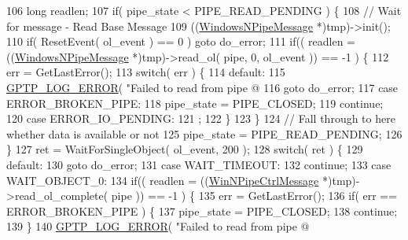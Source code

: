 \begin{DoxyCode}
{{106             \textcolor{keywordtype}{long} readlen;
107             \textcolor{keywordflow}{if}( pipe\_state < PIPE\_READ\_PENDING ) \{
108                 \textcolor{comment}{// Wait for message - Read Base Message}
109                 ((\hyperlink{class_windows_n_pipe_message}{WindowsNPipeMessage} *)tmp)->init();
110                 \textcolor{keywordflow}{if}( ResetEvent( ol\_event ) == 0 ) \textcolor{keywordflow}{goto} do\_error;
111                 \textcolor{keywordflow}{if}(( readlen =  ((\hyperlink{class_windows_n_pipe_message}{WindowsNPipeMessage} *)tmp)->read\_ol( pipe, 0, ol\_event
       )) == -1 ) \{
112                     err = GetLastError();
113                     \textcolor{keywordflow}{switch}( err ) \{
114                     \textcolor{keywordflow}{default}:
115                         \hyperlink{gptp__log_8hpp_afefbb1009717c128012bfeed94842987}{GPTP\_LOG\_ERROR}( \textcolor{stringliteral}{"Failed to read from pipe @%
116                         \textcolor{keywordflow}{goto} do\_error;
117                     \textcolor{keywordflow}{case} ERROR\_BROKEN\_PIPE:
118                         pipe\_state = PIPE\_CLOSED;
119                         \textcolor{keywordflow}{continue};
120                     \textcolor{keywordflow}{case} ERROR\_IO\_PENDING:
121                         ;
122                     \}
123                 \}
124                 \textcolor{comment}{// Fall through to here whether data is available or not}
125                 pipe\_state = PIPE\_READ\_PENDING;
126             \}
127             ret = WaitForSingleObject( ol\_event, 200 );
128             \textcolor{keywordflow}{switch}( ret ) \{
129             \textcolor{keywordflow}{default}:
130                 \textcolor{keywordflow}{goto} do\_error;
131             \textcolor{keywordflow}{case} WAIT\_TIMEOUT:
132                 \textcolor{keywordflow}{continue};
133             \textcolor{keywordflow}{case} WAIT\_OBJECT\_0:
134                 \textcolor{keywordflow}{if}(( readlen = ((\hyperlink{class_win_n_pipe_ctrl_message}{WinNPipeCtrlMessage} *)tmp)->read\_ol\_complete( pipe )) 
      == -1 ) \{
135                     err = GetLastError();
136                     \textcolor{keywordflow}{if}( err == ERROR\_BROKEN\_PIPE ) \{
137                         pipe\_state = PIPE\_CLOSED;
138                         \textcolor{keywordflow}{continue};
139                     \}
140                     \hyperlink{gptp__log_8hpp_afefbb1009717c128012bfeed94842987}{GPTP\_LOG\_ERROR}( \textcolor{stringliteral}{"Failed to read from pipe @%
}}}}
\end{DoxyCode}
